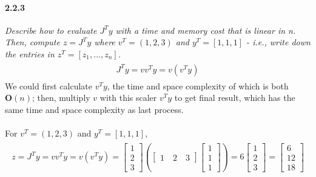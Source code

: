 \documentclass{myhw}
\begin{document}
\begin{homeworkProblem}
\begin{homeworkSection}
\paragraph{2.2.3}
\emph{Describe how to evaluate $J^Ty$ with a time and memory cost that is linear in n. Then, compute $z=J^Ty$ where $v^T=(1,2,3)$ and $y^T=[1,1,1]$ - i.e., write down the entries in $z^T=[z_1, ..., z_n]$.} 
\begin{gather*}
\begin{aligned}
J^Ty = v v^T y = v (v^T y)
\end{aligned}
\end{gather*}
We could first calculate $v^Ty$, the time and space complexity of which is both $\textbf{O}(n)$; then, multiply $v$ with this scaler $v^Ty$ to get final result, which has the same time and space complexity as last process. \\
\\
For $v^T=(1,2,3)$ and $y^T=[1,1,1]$, 
\begin{gather*}
\begin{aligned}
z = J^Ty = v v^T y = v (v^T y) = 
\begin{bmatrix} 1 \\ 2 \\ 3 \end{bmatrix} (\begin{bmatrix} 1 \quad 2 \quad 3 \end{bmatrix} \begin{bmatrix} 1 \\ 1 \\ 1 \end{bmatrix}) = 6 \begin{bmatrix} 1 \\ 2 \\ 3 \end{bmatrix} = \begin{bmatrix} 6 \\ 12 \\ 18 \end{bmatrix}
\end{aligned}
\end{gather*}
\end{homeworkSection}
\end{homeworkProblem}
\end{document}
